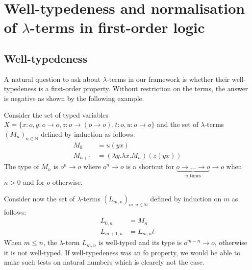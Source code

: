 \section{Well-typedeness and normalisation of $\lambda$-terms in first-order logic}
\label{sec:eval}


\newcommand{\NonLinTerms}[2]{\Lambda_{#1} #2}
 \newcommand{\rlambda}{\ranked{\Lambda}}
 \newcommand{\rlambdalin}{\ranked{\Lambda^{\sf{lin}}}}
 \newcommand{\rlambdathin}{\ranked{\Lambda^{\sf{thin}}}}
\newcommand{\pictureline}[2]{\\   \begin{minipage}{0,6\textwidth}
    #1 
\end{minipage} & \begin{minipage}{0,4\textwidth}#2\end{minipage} \\}


\subsection{Well-typedeness}
A natural question to ask about $\lambda$-terms in our framework is whether their well-typedeness is a first-order property. Without restriction on the terms, the answer is negative as shown by the following example.

\begin{example}
Consider the set of typed variables $X=\{x:o, y:o\rightarrow o, z:o\rightarrow(o\rightarrow o), t:o, u:o\rightarrow o\}$ and the set of $\lambda$-terms $(M_n)_{n\in \mathbb{N}}$ defined by induction as follows: 
\begin{align*}
M_0 &= u(yx)\\
M_{n+1}&= (\lambda y.\lambda x. M_n)(z(yx))
\end{align*}
The type of $M_n$ is $o^n\rightarrow o$ where $o^n\rightarrow o$ is a shortcut for $\underbrace{o\rightarrow\dots\rightarrow o}_{n \text{ times}}\rightarrow o$ when $n>0$ and for $o$ otherwise. 

Consider now the set of $\lambda$-terms $(L_{m,n})_{m,n\in \mathbb{N}}$ defined by induction on $m$ as follows:
\begin{align*}
L_{0,n}&= M_n \\
L_{m+1, n}&=L_{m,n}t
\end{align*}
When $m\leq n$, the $\lambda$-term $L_{m,n}$ is well-typed and its type is $o^{m-n}\rightarrow o$, otherwise it is not well-typed. If well-typedeness was an fo property, we would be able to make such tests on natural numbers which is clearely not the case. 
\end{example}

